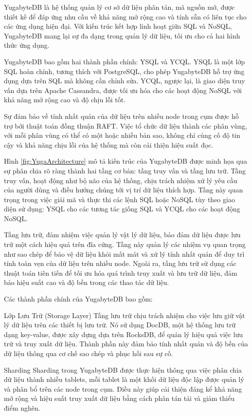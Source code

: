 \documentclass[14pt]{article}
\begin{document}
YugabyteDB là hệ thống quản lý cơ sở dữ liệu phân tán, mã nguồn mở, được thiết kế để đáp ứng nhu cầu về khả năng mở rộng cao và tính sẵn có liên tục cho các ứng dụng hiện đại. Với kiến trúc kết hợp linh hoạt giữa SQL và NoSQL, YugabyteDB mang lại sự đa dạng trong quản lý dữ liệu, tối ưu cho cả hai hình thức ứng dụng.

YugabyteDB bao gồm hai thành phần chính: YSQL và YCQL. YSQL là một lớp SQL hoàn chỉnh, tương thích với PostgreSQL, cho phép YugabyteDB hỗ trợ ứng dụng dựa trên SQL mà không cần chỉnh sửa. YCQL, ngược lại, là giao diện truy vấn dựa trên Apache Cassandra, được tối ưu hóa cho các hoạt động NoSQL với khả năng mở rộng cao và độ chịu lỗi tốt.

Sự đảm bảo về tính nhất quán của dữ liệu trên nhiều node trong cụm được hỗ trợ bởi thuật toán đồng thuận RAFT. Việc tổ chức dữ liệu thành các phân vùng, với mỗi phân vùng có thể có một hoặc nhiều bản sao, không chỉ củng cố độ tin cậy và khả năng chịu lỗi của hệ thống mà còn cải thiện hiệu suất đọc.

Hình \ref{fig:YugaArchitecture} mô tả kiến trúc của YugabyteDB được minh họa qua sự phân chia rõ ràng thành hai tầng cơ bản: tầng truy vấn và tầng lưu trữ. Tầng truy vấn, hoạt động như bộ não của hệ thống, chịu trách nhiệm xử lý yêu cầu của người dùng và điều hướng chúng tới vị trí dữ liệu thích hợp. Tầng này quan trọng trong việc giải mã và thực thi các lệnh SQL hoặc NoSQL tùy theo giao diện sử dụng: YSQL cho các tương tác giống SQL và YCQL cho các hoạt động NoSQL.

Tầng lưu trữ, đảm nhiệm việc quản lý vật lý dữ liệu, bảo đảm dữ liệu được lưu trữ một cách hiệu quả trên đĩa cứng. Tầng này quản lý các nhiệm vụ quan trọng như sao chép để bảo vệ dữ liệu khỏi mất mát và xử lý tính nhất quán để duy trì tính toàn vẹn của dữ liệu trên nhiều node. Ngoài ra, tầng lưu trữ sử dụng các thuật toán tiên tiến để tối ưu hóa quá trình truy xuất và lưu trữ dữ liệu, đảm bảo hiệu suất cao và độ bền trong các thao tác dữ liệu.

Các thành phần chính của YugabyteDB bao gồm:

Lớp Lưu Trữ (Storage Layer)
Tầng lưu trữ chịu trách nhiệm cho việc lưu giữ vật lý dữ liệu trên các thiết bị lưu trữ. Nó sử dụng DocDB, một hệ thống lưu trữ dạng key-value, được xây dựng dựa trên RocksDB, để quản lý hiệu quả việc lưu trữ và truy xuất dữ liệu. Thành phần này đảm bảo tính nhất quán và độ bền của dữ liệu thông qua cơ chế sao chép và phục hồi sau sự cố.

Sharding
Sharding trong YugabyteDB được thực hiện thông qua việc phân chia dữ liệu thành nhiều tablets, mỗi tablet là một khối dữ liệu độc lập được quản lý và phân bổ trên các node trong cụm. Điều này giúp cải thiện đáng kể khả năng mở rộng và hiệu suất truy xuất dữ liệu bằng cách phân tán tải và giảm thiểu điểm nghẽn.
\end{document}
